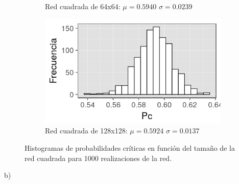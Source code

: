 \documentclass[%
 reprint,
 amsmath,amssymb,
 aps,
spanish]{revtex4-1}
\begin{document}
\begin{figure}[h]
\begin{subfigure}{.25\textwidth}
  \caption{Red cuadrada de 64x64: $\mu=0.5940$ $\sigma=0.0239$}
  \label{fig:1ahist}
\end{subfigure}%
\begin{subfigure}{.25\textwidth}
  \centering
  \includegraphics[width=.9\linewidth]{ej1a/hist128x128}
  \caption{Red cuadrada de 128x128: $\mu=0.5924$ $\sigma=0.0137$}
  \label{fig:1ahist}
\end{subfigure}
\caption{Histogramas de probabilidades críticas en función del tamaño de la red cuadrada para 1000 realizaciones de la red.}
\label{fig:histograma_red_cuadrada_1a}
\end{figure}

b)
\end{document}
